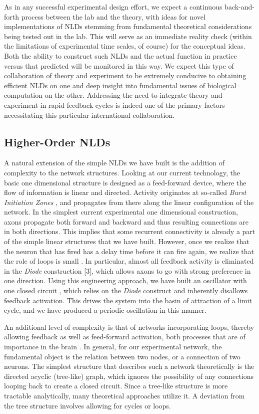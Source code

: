As in any successful experimental design effort, we expect a continuous back-and-forth process between the lab and the theory, with ideas for novel implementations of NLDs stemming from fundamental theoretical considerations being tested out in the lab. This will serve as an immediate reality check (within the limitations of experimental time scales, of course) for the conceptual ideas. Both the ability to construct such NLDs and the actual function in practice versus that predicted will be monitored in this way. We expect this type of collaboration of theory and experiment to be extremely conducive to obtaining efficient NLDs on one and deep insight into fundamental issues of biological computation on the other. Addressing the need to integrate theory and experiment in rapid feedback cycles is indeed one of the primary factors necessitating this particular international collaboration.

\subsection{Higher-Order NLDs}\label{sec:honlds}
A natural extension of the simple NLDs we have built is the addition of complexity to the network structures. Looking at our current technology, the basic one dimensional structure is designed as a feed-forward device, where the flow of information is linear and directed. Activity originates at so-called {\it Burst Initiation Zones} \cite{Feinerman2007}, and propagates from there along the linear configuration of the network. In the simplest current experimental one dimensional construction, axons propagate both forward and backward and thus resulting connections are in both directions. This implies that some recurrent connectivity is already a part of the simple linear structures that we have built. However, once we realize that the neuron that has fired has a delay time before it can fire again, we realize that the role of loops is small \cite{Feinerman2006}. In particular, almost all feedback activity is eliminated in the {\it Diode} construction [3], which allows axons to go with strong preference in one direction. Using this engineering approach, we have built an oscillator with one closed circuit \cite{Feinerman2008}, which relies on the {\it Diode} construct and inherently disallows feedback activation. This drives the system into the basin of attraction of a limit cycle, and we have produced a periodic oscillation in this manner.

An additional level of complexity is that of networks incorporating loops, thereby allowing feedback as well as feed-forward activation, both processes that are of importance in the brain \cite{Ahissar2003}. In general, for our experimental network, the fundamental object is the relation between two nodes, or a connection of two neurons. The simplest structure that describes such a network theoretically is the directed acyclic (tree-like) graph, which ignores the possibility of any connections looping back to create a closed circuit. Since a tree-like structure is more tractable analytically, many theoretical approaches utilize it. A deviation from the tree structure involves allowing for cycles or loops.

